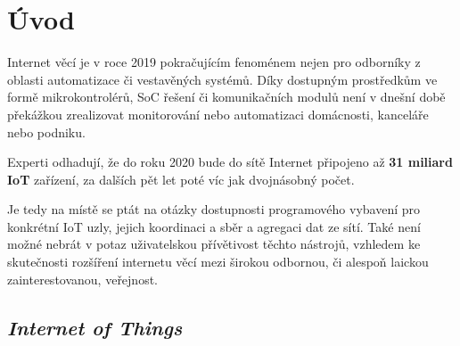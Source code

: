 \chapter{Úvod}
\label{ch:uvod}

Internet věcí je v roce 2019 pokračujícím fenoménem nejen pro odborníky z oblasti automatizace či vestavěných systémů. Díky dostupným prostředkům ve formě mikrokontrolérů, SoC řešení či komunikačních modulů není v dnešní době překážkou zrealizovat monitorování nebo automatizaci domácnosti, kanceláře nebo podniku.

Experti odhadují, že do roku 2020 bude do sítě Internet připojeno až \textbf{31 miliard IoT} zařízení, za dalších pět let poté víc jak dvojnásobný počet.

Je tedy na místě se ptát na otázky dostupnosti programového vybavení pro konkrétní IoT uzly, jejich koordinaci a sběr a agregaci dat ze sítí. Také není možné nebrát v potaz uživatelskou přívětivost těchto nástrojů, vzhledem ke skutečnosti rozšíření internetu věcí mezi širokou odbornou, či alespoň laickou zainterestovanou, veřejnost.

\cite{ESP32Datasheet}
\section{\emph{Internet of Things}}

